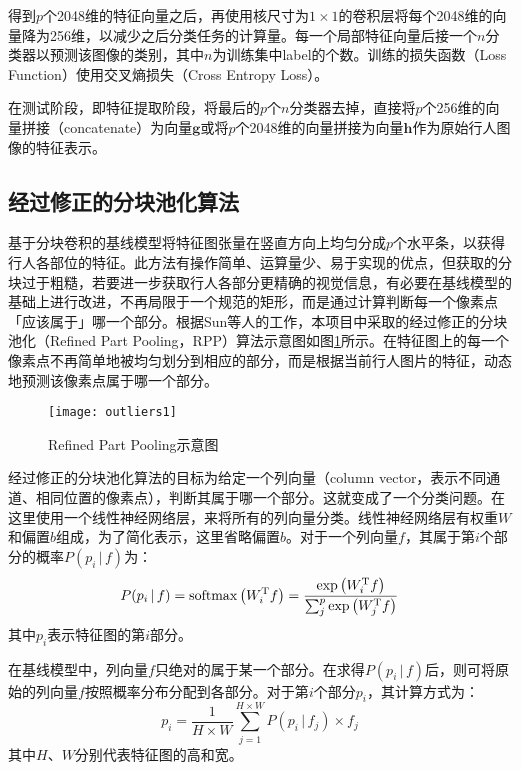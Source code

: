 得到$p$个2048维的特征向量之后，再使用核尺寸为$1\times1$的卷积层将每个2048维的向量降为256维，以减少之后分类任务的计算量。每一个局部特征向量后接一个$n$分类器以预测该图像的类别，其中$n$为训练集中label的个数。训练的损失函数（Loss Function）使用交叉熵损失（Cross Entropy Loss）。

在测试阶段，即特征提取阶段，将最后的$p$个$n$分类器去掉，直接将$p$个256维的向量拼接（concatenate）为向量$\boldsymbol{g}$或将$p$个2048维的向量拼接为向量$\boldsymbol{h}$作为原始行人图像的特征表示。

\subsection{经过修正的分块池化算法}

基于分块卷积的基线模型将特征图张量在竖直方向上均匀分成$p$个水平条，以获得行人各部位的特征。此方法有操作简单、运算量少、易于实现的优点，但获取的分块过于粗糙，若要进一步获取行人各部分更精确的视觉信息，有必要在基线模型的基础上进行改进，不再局限于一个规范的矩形，而是通过计算判断每一个像素点「应该属于」哪一个部分。根据Sun等人的工作\cite{sun2017beyond}，本项目中采取的经过修正的分块池化（Refined Part Pooling，RPP）算法示意图如图\ref{fig:refined}所示。在特征图上的每一个像素点不再简单地被均匀划分到相应的部分，而是根据当前行人图片的特征，动态地预测该像素点属于哪一个部分。

\begin{figure}[!htb]
\centering
\texttt{[image: outliers1]}
\caption{Refined Part Pooling示意图\cite{sun2017beyond}}
\label{fig:refined}
\end{figure}

经过修正的分块池化算法的目标为给定一个列向量（column vector，表示不同通道、相同位置的像素点），判断其属于哪一个部分。这就变成了一个分类问题。在这里使用一个线性神经网络层，来将所有的列向量分类。线性神经网络层有权重$W$和偏置$b$组成，为了简化表示，这里省略偏置$b$。对于一个列向量$f$，其属于第$i$个部分的概率$P(p_i\,\vert\,f)$为：
\begin{equation}
P(p_i\,\vert\,f)=\mathop{\rm softmax}\left(W_i^{\rm T}f\right)=\frac{\exp\left(W_i^{\rm T}f\right)}{\sum_j^p\exp\left(W_j^{\rm T}f\right)}
\end{equation}
其中$p_i$表示特征图的第$i$部分。

在基线模型中，列向量$f$只绝对的属于某一个部分。在求得$P(p_i\,\vert\,f)$后，则可将原始的列向量$f$按照概率分布分配到各部分。对于第$i$个部分$p_i$，其计算方式为：
\begin{equation}
p_i=\frac{1}{H\times W}\sum_{j=1}^{H\times W}P(p_i\,\vert\,f_j)\times f_j
\end{equation}
其中$H$、$W$分别代表特征图的高和宽。

